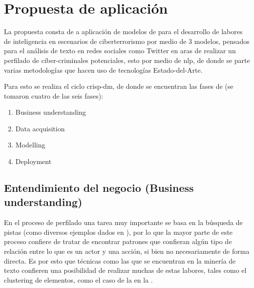 
\chapter{Propuesta de aplicación} %

\label{chap:proposal} %


\newcommand{\nmodels}{{3 }}

La propuesta consta de a aplicación de modelos de  para el desarrollo de labores de inteligencia en escenarios de ciberterrorismo por medio de \nmodels modelos, pensados para el análisis de texto en redes sociales como Twitter en aras de realizar un perfilado de ciber-criminales potenciales, esto por medio de \gls{nlp}, de donde se parte varias metodologías que hacen uso de tecnologías \mbox{Estado-del-Arte}.

Para esto se realiza el ciclo \gls{crisp-dm}, de donde se encuentran las fases de (se tomaron cuatro de las seis fases):
\begin{enumerate}
\item Business understanding
\item Data acquisition
\item Modelling
\item Deployment
\end{enumerate}

\section{Entendimiento del negocio (Business understanding)}
En el proceso de perfilado una tarea muy importante se basa en la búsqueda de pistas (como diversos ejemplos dados en \cite{mena2003investigative}), por lo que la mayor parte de este proceso confiere de tratar de encontrar patrones que confieran algún tipo de relación entre lo que es un actor y una acción, si bien no necesariamente de forma directa. Es por esto que técnicas como las que se encuentran en la minería de texto confieren una posibilidad de realizar muchas de estas labores, tales como el \gls{clustering} de elementos, como el caso de la  en la .

